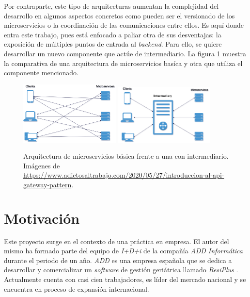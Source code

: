 \documentclass[11pt,spanish,listoffigures]{tfgetsinf}
\begin{document}
Por contraparte, este tipo de arquitecturas aumentan la complejidad del desarrollo en algunos aspectos concretos como pueden ser el versionado de los microservicios o la coordinación de las comunicaciones entre ellos. Es aquí donde entra este trabajo, pues está enfocado a paliar otra de sus desventajas: la exposición de múltiples puntos de entrada al \emph{backend}. Para ello, se quiere desarrollar un nuevo componente que actúe de intermediario. La figura \ref{figura:intermediario_o_no} muestra la comparativa de una arquitectura de microservicios basíca y otra que utiliza el componente mencionado.

\begin{figure}[ht]
	\centering
	\label{figura:intermediario_o_no}
	\includegraphics[width=0.45\textwidth]{images/arquitecturaMicroserviciosBasica}
	\includegraphics[width=0.45\textwidth]{images/arquitecturaMicroserviciosConIntermediario}
	\caption{Arquitectura de microservicios básica frente a una con intermediario. Imágenes de \url{https://www.adictosaltrabajo.com/2020/05/27/introduccion-al-api-gateway-pattern}.}
\end{figure}

\section{Motivación}

Este proyecto surge en el contexto de una práctica en empresa. El autor del mismo ha formado parte del equipo de \emph{I+D+i} de la compañía \emph{ADD Informática} durante el periodo de un año. \emph{ADD} es una empresa española que se dedica a desarrollar y comercializar un \emph{software} de gestión geriátrica llamado \emph{ResiPlus} \cite{ResiPlus}. Actualmente cuenta con casi cien trabajadores, es líder del mercado nacional y se encuentra en proceso de expansión internacional.
\end{document}

